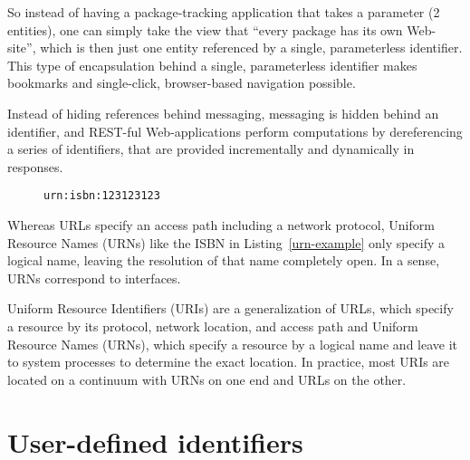 \documentclass[preprint,authoryear]{acm_proc_article-sp}
\begin{document}
So instead of having
a package-tracking application that takes a parameter (2 entities),
one can simply take the view that ``every package has its own 
Web-site'', which is then just one entity referenced by a single,
parameterless identifier.  This type of encapsulation behind
a single, parameterless identifier makes bookmarks and single-click,
browser-based navigation possible.


Instead of hiding references behind messaging,
messaging is hidden behind an identifier, and REST-ful Web-applications
perform computations by dereferencing a series of identifiers, that 
are provided incrementally and dynamically in responses.


\begin{figure}[htbp]
\begin{lstlisting}[style=L,label=urn-example,caption=A Uniform Resource Name.]
urn:isbn:123123123
\end{lstlisting}
\end{figure}

Whereas URLs specify an access path including a network protocol, Uniform 
Resource Names (URNs) like the ISBN in Listing~\ref{urn-example} only specify a logical
name, leaving the resolution of that name completely open.  In a sense, URNs
correspond to interfaces.

Uniform Resource Identifiers (URIs) are a generalization of URLs, which specify a
resource by its protocol, network location, and access path and Uniform Resource Names (URNs),
which specify
a resource by a logical name and leave it to system processes to 
determine the exact location.  In practice, most URIs are located on
a continuum with URNs on one end and URLs on the other.


\section{User-defined identifiers}
\label{user-defined-identifiers}
\end{document}
